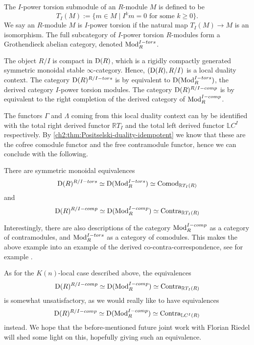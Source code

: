 The $I$-power torsion submodule of an $R$-module $M$ is defined to be 
\[T_I(M) := \{m \in M \mid I^k m = 0 \text{ for some } k\geq 0\}.\]
We say an $R$-module $M$ is $I$-power torsion if the natural map $T_I(M) \to M$ is an isomorphism. The full subcategory of $I$-power torsion $R$-modules form a Grothendieck abelian category, denoted $\mathrm{Mod}_R^{I-tors}$. 

The object $R/I$ is compact in $\mathrm{D}(R)$, which is a rigidly compactly generated symmetric monoidal stable $\infty$-category. Hence, $(\mathrm{D}(R), R/I)$ is a local duality context. The category $\mathrm{D}(R)^{R/I-tors}$ is by \cite[3.7(2)]{barthel-heard-valenzuela_2020} equivalent to $\mathrm{D}(\mathrm{Mod}_R^{I-tors})$, the derived category $I$-power torsion modules. The category $\mathrm{D}(R)^{R/I-comp}$ is by \cite[3.7(1)]{barthel-heard-valenzuela_2020} equivalent to the right completion of the derived category of $\mathrm{Mod}_R^{I-comp}$. 

The functors $\Gamma$ and $\Lambda$ coming from this local duality context can by \cite[3.16]{barthel-heard-valenzuela_2018} be identified with the total right derived functor $\mathbb{R}T_I$ and the total left derived functor $\mathbb{L}C^I$ respectively. By \cref{ch2:thm:Positselski-duality-idempotent} we know that these are the cofree comodule functor and the free contramodule functor, hence we can conclude with the following. 

\begin{proposition}
    There are symmetric monoidal equivalences
    \[\mathrm{D}(R)^{R/I-tors}\simeq \mathrm{D}(\mathrm{Mod}_R^{I-tors})\simeq \mathrm{Comod}_{\mathbb{R}T_I(R)}\]
    and 
    \[\mathrm{D}(R)^{R/I-comp}\simeq \mathrm{D}(\mathrm{Mod}_R^{I-comp})\simeq \mathrm{Contra}_{\mathbb{R}T_I(R)}\]
\end{proposition}

Interestingly, there are also descriptions of the category $\mathrm{Mod}_R^{I-comp}$ as a category of contramodules, and $\mathrm{Mod}_R^{I-tors}$ as a category of comodules. This makes the above example into an example of the derived co-contra-correspondence, see for example \cite{positselski_2016}. 

As for the $K(n)$-local case described above, the equivalences
\[\mathrm{D}(R)^{R/I-comp}\simeq \mathrm{D}(\mathrm{Mod}_R^{I-comp})\simeq \mathrm{Contra}_{\mathbb{R}T_I(R)}\]
is somewhat unsatisfactory, as we would really like to have equivalences 
\[\mathrm{D}(R)^{R/I-comp}\simeq \mathrm{D}(\mathrm{Mod}_R^{I-comp})\simeq \mathrm{Contra}_{\mathbb{L}C^I(R)}\]
instead. We hope that the before-mentioned future joint work with Florian Riedel will shed some light on this, hopefully giving such an equivalence.  